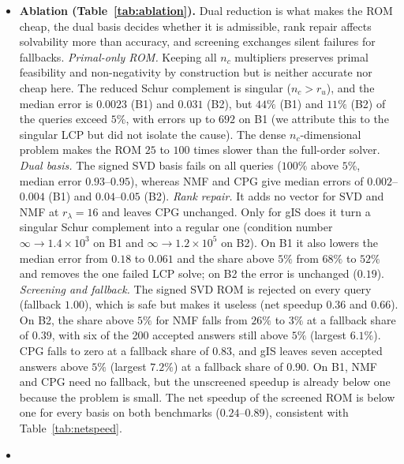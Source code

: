 \documentclass[11pt,a4paper]{article}
\begin{document}
\begin{itemize}
\item
  \textbf{Ablation (Table~\ref{tab:ablation}).} Dual reduction is what makes the ROM cheap, the dual basis decides whether it is admissible, rank repair affects solvability more than accuracy, and screening exchanges silent failures for fallbacks.
  \emph{Primal-only ROM.} Keeping all $n_c$ multipliers preserves primal feasibility and non-negativity by construction but is neither accurate nor cheap here. The reduced Schur complement is singular ($n_c > r_u$), and the median error is $0.0023$ (B1) and $0.031$ (B2), but $44\%$ (B1) and $11\%$ (B2) of the queries exceed $5\%$, with errors up to $692$ on B1 (we attribute this to the singular LCP but did not isolate the cause). The dense $n_c$-dimensional problem makes the ROM $25$ to $100$ times slower than the full-order solver.
  \emph{Dual basis.} The signed SVD basis fails on all queries ($100\%$ above $5\%$, median error $0.93$--$0.95$), whereas NMF and CPG give median errors of $0.002$--$0.004$ (B1) and $0.04$--$0.05$ (B2).
  \emph{Rank repair.} It adds no vector for SVD and NMF at $r_\lambda = 16$ and leaves CPG unchanged. Only for gIS does it turn a singular Schur complement into a regular one (condition number $\infty \to 1.4\times10^{3}$ on B1 and $\infty \to 1.2\times10^{5}$ on B2). On B1 it also lowers the median error from $0.18$ to $0.061$ and the share above $5\%$ from $68\%$ to $52\%$ and removes the one failed LCP solve; on B2 the error is unchanged ($0.19$).
  \emph{Screening and fallback.} The signed SVD ROM is rejected on every query (fallback $1.00$), which is safe but makes it useless (net speedup $0.36$ and $0.66$). On B2, the share above $5\%$ for NMF falls from $26\%$ to $3\%$ at a fallback share of $0.39$, with six of the 200 accepted answers still above $5\%$ (largest $6.1\%$). CPG falls to zero at a fallback share of $0.83$, and gIS leaves seven accepted answers above $5\%$ (largest $7.2\%$) at a fallback share of $0.90$. On B1, NMF and CPG need no fallback, but the unscreened speedup is already below one because the problem is small. The net speedup of the screened ROM is below one for every basis on both benchmarks ($0.24$--$0.89$), consistent with Table~\ref{tab:netspeed}.
\item

\end{itemize}
\end{document}
